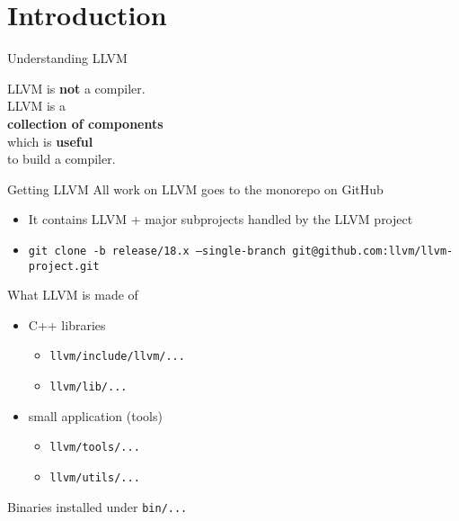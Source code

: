 
\section{Introduction}


\begin{frame}{Understanding LLVM}
	\begin{center}
	\huge{
		LLVM is \textbf{not} a compiler.\\
		\pause
		\vfill
		LLVM is a\\\textbf{collection of components}\\
		which is \textbf{useful}\\to build a compiler.
	}
	\end{center}
\end{frame}


\begin{frame}{Getting LLVM}
All work on LLVM goes to the \alert{monorepo} on GitHub\\
\bigskip
		\begin{itemize}
			\item It contains LLVM + major subprojects handled by the LLVM project
			\item \texttt{git clone -b release/18.x --single-branch git@github.com:llvm/llvm-project.git}
		\end{itemize}
\end{frame}


\begin{frame}{What LLVM is made of}
\begin{itemize}
	\item C++ libraries
		\begin{itemize}
			\item \texttt{llvm/include/llvm/...}
			\item \texttt{llvm/lib/...}
		\end{itemize}
		\vfill
	\item small application (tools)
		\begin{itemize}
			\item \texttt{llvm/tools/...}
			\item \texttt{llvm/utils/...}
		\end{itemize}
\end{itemize}
\vfill
Binaries installed under \texttt{bin/...}
\end{frame}


